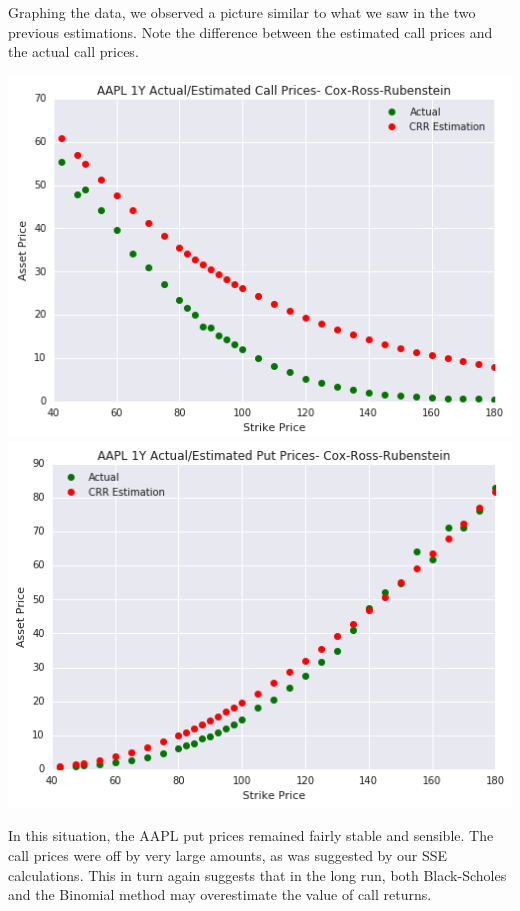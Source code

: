 Graphing the data, we observed a picture similar to what we saw in the two previous estimations. Note the difference between the estimated call prices and the actual call prices.

\begin{center}
\includegraphics[scale=0.66, keepaspectratio=true]{Chapter3/AAPL1YCall.png}
\includegraphics[scale=0.66, keepaspectratio=true]{Chapter3/AAPL1YPut.png}
\end{center}

In this situation, the AAPL put prices remained fairly stable and sensible. The call prices were off by very large amounts, as was suggested by our SSE calculations. This in turn again suggests that in the long run, both Black-Scholes and the Binomial method may overestimate the value of call returns.



